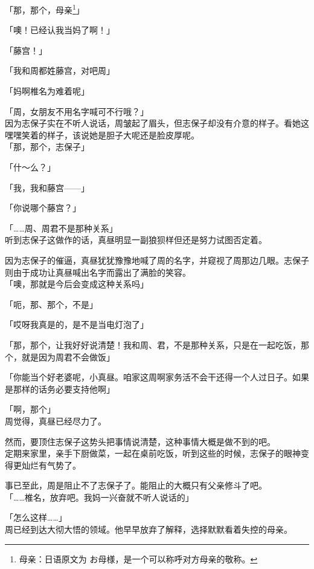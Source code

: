 「那，那个，母亲\footnote{母亲：日语原文为 {\jpfont お母様}，是一个可以称呼对方母亲的敬称。}」

「噢！已经认我当妈了啊！」

「藤宫！」

「我和周都姓藤宫，对吧周」

「妈啊椎名为难着呢」

「周，女朋友不用名字喊可不行哦？」\\

因为志保子实在不听人说话，周皱起了眉头，但志保子却没有介意的样子。看她这嘿嘿笑着的样子，该说她是胆子大呢还是脸皮厚呢。\\

「那，那个，志保子」

「什～么？」

「我，我和藤宫——」

「你说哪个藤宫？」

「……周、周君不是那种关系」\\

听到志保子这做作的话，真昼明显一副狼狈样但还是努力试图否定着。

因为志保子的催逼，真昼犹犹豫豫地喊了周的名字，并窥视了周那边几眼。志保子则由于成功让真昼喊出名字而露出了满脸的笑容。\\

「噢，那就是今后会变成这种关系吗」

「呃，那、那个，不是」

「哎呀我真是的，是不是当电灯泡了」

「那，那个，让我好好说清楚！我和周、君，不是那种关系，只是在一起吃饭，那个，就是因为周君不会做饭」

「你能当个好老婆呢，小真昼。咱家这周啊家务活不会干还得一个人过日子。如果是那样的话务必要支持他啊」

「啊，那个」\\

周觉得，真昼已经尽力了。

然而，要顶住志保子这势头把事情说清楚，这种事情大概是做不到的吧。\\

定期来家里，亲手下厨做菜，一起在桌前吃饭，听到这些的时候，志保子的眼神变得更灿烂有气势了。

事已至此，周是阻止不了志保子了。能阻止的大概只有父亲修斗了吧。\\

「……椎名，放弃吧。我妈一兴奋就不听人说话的」

「怎么这样……」\\

周已经到达大彻大悟的领域。他早早放弃了解释，选择默默看着失控的母亲。
